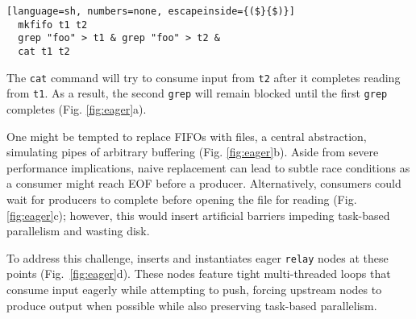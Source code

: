 \documentclass[letterpaper,twocolumn,10pt]{article}
\newcommand{\ttt}[1]{\texttt{#1}}
\newcommand{\TODO}[1]{\hl{\textbf{TODO:} #1}\xspace}
\begin{document}
\begin{lstlisting}[language=sh, numbers=none, escapeinside={($}{$)}]
  mkfifo t1 t2
  grep "foo" > t1 & grep "foo" > t2 &
  cat t1 t2
\end{lstlisting}

\noindent
The \ttt{cat} command will try to consume input from \ttt{t2} after it completes reading from \ttt{t1}.
As a result, the second \ttt{grep} will remain blocked until the first \ttt{grep} completes (Fig. \ref{fig:eager}a). %

One might be tempted to replace FIFOs with files, a central \unix abstraction, simulating pipes of arbitrary buffering (Fig. \ref{fig:eager}b).
Aside from severe performance implications, naive replacement can lead to subtle race conditions as a consumer might reach {\sc EOF} before a producer.
Alternatively, consumers could wait for producers to complete before opening the file for reading (Fig. \ref{fig:eager}c);
however, this would insert artificial barriers impeding task-based parallelism and wasting disk.

To address this challenge,
  \sys inserts and instantiates eager \ttt{relay} nodes at these points (Fig.~\ref{fig:eager}d). %
These nodes feature tight multi-threaded loops that consume input eagerly while attempting to push, forcing upstream nodes to produce output when possible while also preserving task-based parallelism.


\end{document}
